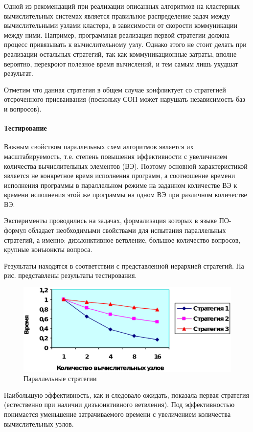 Одной из рекомендаций при реализации описанных алгоритмов на кластерных вычислительных системах является правильное распределение задач между вычислительными узлами кластера, в зависимости от скорости коммуникации между ними. Например, программная реализация первой стратегии должна процесс привязывать к вычислительному узлу. Однако этого не стоит делать при реализации остальных стратегий, так как коммуникационные затраты, вполне вероятно, перекроют полезное время вычислений, и тем самым лишь ухудшат результат.

Отметим что данная стратегия в общем случае конфликтует со стратегией отсроченного присваивания (поскольку СОП может нарушать независимость баз и вопросов).

\paragraph{Тестирование}
Важным свойством параллельных схем алгоритмов является их масштабируемость, т.е. степень повышения эффективности с увеличением количества вычислительных элементов (ВЭ). Поэтому основной характеристикой является не конкретное время исполнения программ, а соотношение времени исполнения программы в параллельном режиме на заданном количестве ВЭ к времени исполнения этой же программы на одном ВЭ при различном количестве ВЭ.

Эксперименты проводились на задачах, формализация которых в языке ПО-формул обладает необходимыми свойствами для испытания параллельных стратегий, а именно: дизъюнктивное ветвление, большое количество вопросов, крупные конъюнкты вопроса.

Результаты находятся в соответствии с представленной иерархией стратегий. На рис. представлены результаты тестирования.

\begin{figure}[h]
	\centering
	\includegraphics[width=0.6\linewidth]{pics/Parallel.eps}
	\caption{Параллельные стратегии}
	\label{fig:parallel}
\end{figure}

Наибольшую эффективность, как и следовало ожидать, показала первая стратегия (естественно при наличии дизъюнктивного ветвления). Под эффективностью понимается уменьшение затрачиваемого времени с увеличением количества вычислительных узлов.


